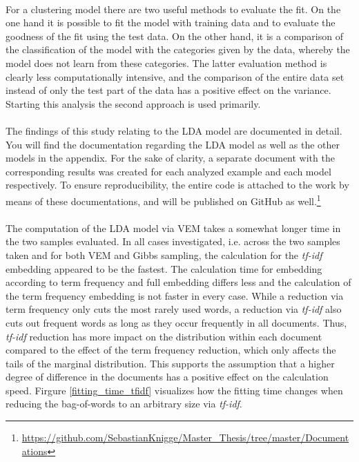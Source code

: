 \documentclass[11pt,a4paper]{article}
\begin{document}
\ \\
For a clustering model there are two useful methods to evaluate the fit. On the one hand it is possible to fit the model with training data and to evaluate the goodness of the fit using the test data. On the other hand, it is a comparison of the classification of the model with the categories given by the data, whereby the model does not learn from these categories. The latter evaluation method is clearly less computationally intensive, and the comparison of the entire data set instead of only the test part of the data has a positive effect on the variance. Starting this analysis the second approach is used primarily.\\
\ \\
The findings of this study relating to the LDA model are documented in detail. You will find the documentation regarding the LDA model as well as the other models in the appendix. For the sake of clarity, a separate document with the corresponding results was created for each analyzed example and each model respectively. To ensure reproducibility, the entire code is attached to the work by means of these documentations, and will be published on GitHub as well.\footnote{\url{https://github.com/SebastianKnigge/Master_Thesis/tree/master/Documentations} }\\
\ \\
The computation of the LDA model via VEM takes a somewhat longer time in the two samples evaluated. In all cases investigated, i.e. across the two samples taken and for both VEM and Gibbs sampling, the calculation for the \textit{tf-idf} embedding appeared to be the fastest. The calculation time for embedding according to term frequency and full embedding differs less and the calculation of the term frequency embedding is not faster in every case. While a reduction via term frequency only cuts the most rarely used words, a reduction via \textit{tf-idf} also cuts out frequent words as long as they occur frequently in all documents. Thus, \textit{tf-idf} reduction has more impact on the distribution within each document compared to the effect of the term frequency reduction, which only affects the tails of the marginal distribution. This supports the assumption that a higher degree of difference in the documents has a positive effect on the calculation speed. Firgure \ref{fitting_time_tfidf} visualizes how the fitting time changes when reducing the bag-of-words to an arbitrary size via \textit{tf-idf}.\\
\end{document}
